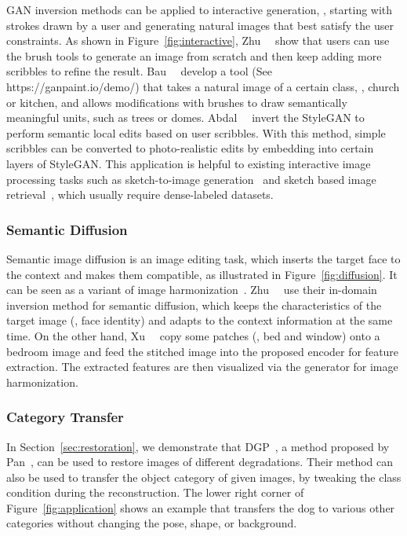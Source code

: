 GAN inversion methods can be applied to interactive generation, \ie, starting with strokes drawn by a user and generating natural images that best satisfy the user constraints. 
As shown in Figure~\ref{fig:interactive}, Zhu~\etal~\cite{zhu2016generative} show that users can use the brush tools to generate an image from scratch and then keep adding more scribbles to refine the result.
Bau~\etal~\cite{bau2019ganpaint} develop a tool (See https://ganpaint.io/demo/) that takes a natural image of a certain class, \eg, church or kitchen, and allows modifications with brushes to draw semantically meaningful units, such as trees or domes.
Abdal~\etal~\cite{abdal2020image2stylegan2} invert the StyleGAN to perform semantic local edits based on user scribbles. 
With this method, simple scribbles can be converted to photo-realistic edits 
by embedding into certain layers of StyleGAN.
This application is helpful to existing interactive image processing tasks such as sketch-to-image generation~\cite{xia2019sketch,ghosh2019isketchnfill,chenDeepFaceDrawing2020} and sketch based image retrieval~\cite{eitz2010sketch,dey2019doodle}, which usually require dense-labeled datasets.

\figinteractive

\subsubsection{Semantic Diffusion}
\label{sec:diffusion}
Semantic image diffusion is an image editing task, which inserts the target face to the context and makes them compatible, as illustrated in Figure~\ref{fig:diffusion}. 
It can be seen as a variant of image harmonization~\cite{cohen2006color,huang2018multimodal,tsai2017deep}.
Zhu~\etal~\cite{zhu2020indomain} use their in-domain inversion method for semantic diffusion, which keeps the characteristics of the target image (\eg, face identity) and adapts to the context information at the same time.
On the other hand, Xu~\etal~\cite{xu2021ghfeat} copy some patches (\eg, bed and window) onto a bedroom image and feed the stitched image into the proposed encoder for feature extraction. 
The extracted features are then visualized via the generator for image harmonization.

\subsubsection{Category Transfer}
\label{sec:category}
In Section~\ref{sec:restoration}, we demonstrate that DGP~\cite{pan2020exploiting}, a method proposed by Pan~\etal, can be used to restore images of different degradations.
Their method can also be used to transfer the object category of given images, by tweaking the class condition during the reconstruction. 
The lower right corner of  Figure~\ref{fig:application} shows an example that transfers the dog to various other categories without changing the pose, shape, or background.

